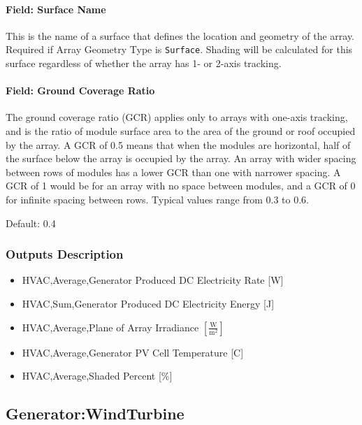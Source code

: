 \paragraph{Field: Surface Name}\label{generatorpvwatts-field-surface-name}

This is the name of a surface that defines the location and geometry of
the array. Required if Array Geometry Type is \texttt{Surface}. Shading
will be calculated for this surface regardless of whether the array has
1- or 2-axis tracking.

\paragraph{Field: Ground Coverage Ratio}\label{field-ground-coverage-ratio}

The ground coverage ratio (GCR) applies only to arrays with one-axis
tracking, and is the ratio of module surface area to the area of the
ground or roof occupied by the array. A GCR of 0.5 means that when the
modules are horizontal, half of the surface below the array is occupied
by the array. An array with wider spacing between rows of modules has a
lower GCR than one with narrower spacing. A GCR of 1 would be for an
array with no space between modules, and a GCR of 0 for infinite spacing
between rows. Typical values range from 0.3 to 0.6.

Default: 0.4

\subsubsection{Outputs Description}\label{outputs-description}

\begin{itemize}
\item
  HVAC,Average,Generator Produced DC Electricity Rate {[}W{]}
\item
  HVAC,Sum,Generator Produced DC Electricity Energy {[}J{]}
\item
  HVAC,Average,Plane of Array Irradiance $\left [\frac{\text{W}}{\text{m}^2} \right ]$
\item
  HVAC,Average,Generator PV Cell Temperature {[}C{]}
\item
  HVAC,Average,Shaded Percent {[}\%{]}
\end{itemize}


\subsection{Generator:WindTurbine}\label{generatorwindturbine}


